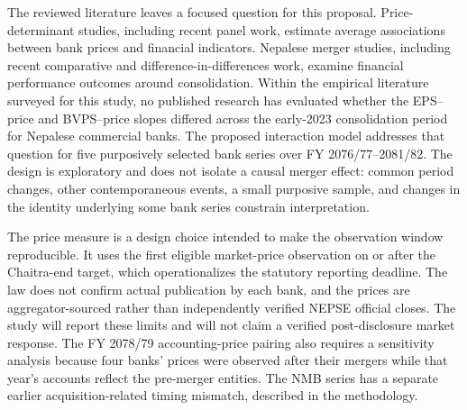 \begin{sloppypar}
The reviewed literature leaves a focused question for this proposal. Price-determinant studies, including recent panel work, estimate average associations between bank prices and financial indicators. Nepalese merger studies, including recent comparative and difference-in-differences work, examine financial performance outcomes around consolidation. Within the empirical literature surveyed for this study, no published research has evaluated whether the EPS--price and BVPS--price slopes differed across the early-2023 consolidation period for Nepalese commercial banks. The proposed interaction model addresses that question for five purposively selected bank series over FY 2076/77--2081/82. The design is exploratory and does not isolate a causal merger effect: common period changes, other contemporaneous events, a small purposive sample, and changes in the identity underlying some bank series constrain interpretation.
\end{sloppypar}

The price measure is a design choice intended to make the observation window reproducible. It uses the first eligible market-price observation on or after the Chaitra-end target, which operationalizes the statutory reporting deadline. The law does not confirm actual publication by each bank, and the prices are aggregator-sourced rather than independently verified NEPSE official closes. The study will report these limits and will not claim a verified post-disclosure market response. The FY 2078/79 accounting-price pairing also requires a sensitivity analysis because four banks' prices were observed after their mergers while that year's accounts reflect the pre-merger entities. The NMB series has a separate earlier acquisition-related timing mismatch, described in the methodology.
